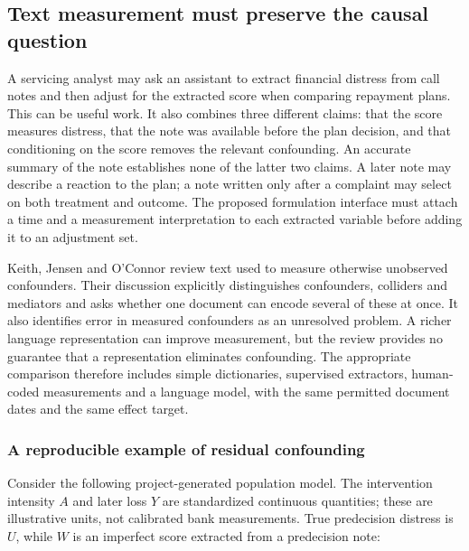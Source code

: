 \hypertarget{text-measurement-must-preserve-the-causal-question}{%
\subsection{Text measurement must preserve the causal
question}\label{text-measurement-must-preserve-the-causal-question}}

\label{exec13:census-measurement}

A servicing analyst may ask an assistant to extract financial distress
from call notes and then adjust for the extracted score when comparing
repayment plans. This can be useful work. It also combines three
different claims: that the score measures distress, that the note was
available before the plan decision, and that conditioning on the score
removes the relevant confounding. An accurate summary of the note
establishes none of the latter two claims. A later note may describe a
reaction to the plan; a note written only after a complaint may select
on both treatment and outcome. The proposed formulation interface must
attach a time and a measurement interpretation to each extracted
variable before adding it to an adjustment set.

Keith, Jensen and O'Connor review text used to measure otherwise
unobserved confounders. Their discussion explicitly distinguishes
confounders, colliders and mediators and asks whether one document can
encode several of these at once. It also identifies error in measured
confounders as an unresolved problem. A richer language representation
can improve measurement, but the review provides no guarantee that a
representation eliminates confounding. The appropriate comparison
therefore includes simple dictionaries, supervised extractors,
human-coded measurements and a language model, with the same permitted
document dates and the same effect target.
\citep{exec13_census_text_review_arxiv}

\hypertarget{a-reproducible-example-of-residual-confounding}{%
\subsubsection{A reproducible example of residual
confounding}\label{a-reproducible-example-of-residual-confounding}}

Consider the following project-generated population model. The
intervention intensity \(A\) and later loss \(Y\) are standardized
continuous quantities; these are illustrative units, not calibrated bank
measurements. True predecision distress is \(U\), while \(W\) is an
imperfect score extracted from a predecision note:

